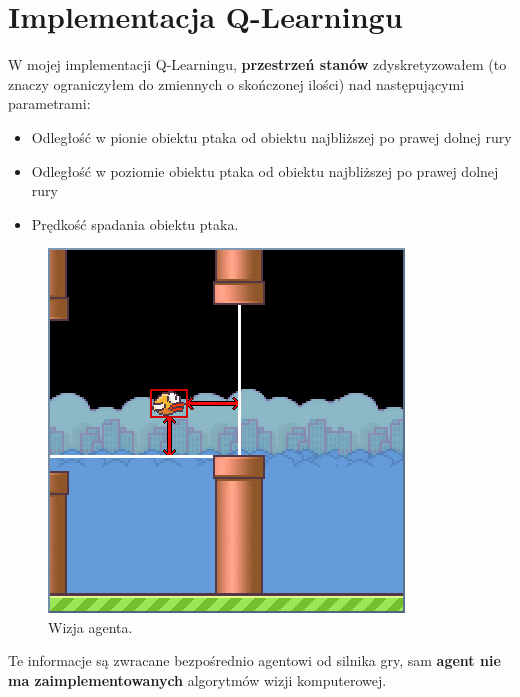 \documentclass[a4paper, 12pt,oneside]{book}
\begin{document}
\section{Implementacja Q-Learningu}
W mojej implementacji Q-Learningu, \textbf{przestrzeń stanów} zdyskretyzowałem
(to znaczy ograniczyłem do zmiennych o skończonej ilości) nad następującymi
parametrami:
\begin{itemize}
	\setlength\itemsep{-0.4em}
	\item Odległość w pionie obiektu ptaka od obiektu najbliższej po prawej
		dolnej rury
	\item Odległość w poziomie obiektu ptaka od obiektu najbliższej po 
		prawej dolnej rury
	\item Prędkość spadania obiektu ptaka.
\end{itemize}
\begin{figure}[!htb]
	\begin{center}
	\includegraphics[scale=0.50]{agent_vision.png}
	\end{center}
	\caption{Wizja agenta.}
	\label{agent_vision}
\end{figure}

Te informacje są zwracane bezpośrednio agentowi od silnika gry, sam 
\textbf{agent nie ma zaimplementowanych} algorytmów wizji komputerowej.
\end{document}
